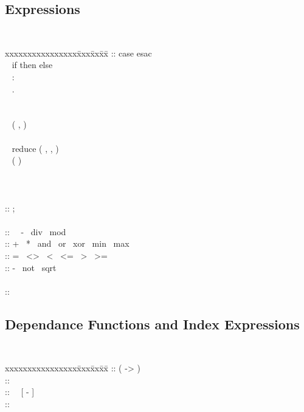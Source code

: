 \subsection{Expressions}
{\tt
\begin{tabbing}
xxxxxxxxxxxxxxxx\= xxx\= xx\=  xx\= \kill
\Expression\>::\>\> case \ExpressionList esac \\
\>\> \Alt\ \> if \Expression then \Expression else \Expression\\
\>\> \Alt\ \> \Domain :\Expression\\
\>\> \Alt\ \> \Expression .\AffineFunction\\
\>\> \Alt\ \> \Expression [ \IndexExpList ] \\
\>\> \Alt\ \> \Expression \BinaryOp \Expression\\
\>\> \Alt\ \> \BinaryOp ( \Expression, \Expression ) \\
\>\> \Alt\ \> \UnaryOp \Expression\\
\>\> \Alt\ \> reduce ( \CommutativeOp, \AffineFunction, \Expression ) \\
\>\> \Alt\ \> ( \Expression ) \\
\>\> \Alt\ \> \Identifier\\
\>\> \Alt\ \> \Constant\\
\\
\ExpressionList \>::\>\> \Opt{ \ExpressionList  } \Expression ;\\
\\
\BinaryOp \>::\>\> \CommutativeOp \Alt\ \RelativeOp \Alt\ - \Alt\ div \Alt\ mod\\
\CommutativeOp \>::\>\> + \Alt\ * \Alt\ and \Alt\ or \Alt\ xor \Alt\ min \Alt\ max\\
\RelativeOp \>::\>\> = \Alt\ <> \Alt\ < \Alt\ <= \Alt\ > \Alt\ >=\\
\UnaryOp \>::\>\> - \Alt\ not \Alt\ sqrt\\
\\
\Constant \>::\>\> \IntegerConstant \Alt\ \RealConstant \Alt\ \BooleanConstant\\
\end{tabbing}
}


\subsection{Dependance Functions and Index Expressions}
{\tt
\begin{tabbing}
xxxxxxxxxxxxxxxx\= xxx\= xx\=  xx\= \kill
\AffineFunction \>::\>\> ( \IndexList -> \IndexExpList )\\
\IndexExpList \>::\>\> \Opt{ \IndexExpList, } \IndexExpression\
          \Alt\ \IndexExpression\\
\IndexExpression \>::\>\> \IndexExpression \Group{+ \Alt\  - } \IndexTerm\
          \Alt\ [ - ] \IndexTerm\\
\IndexTerm \>::\>\> \IntegerConstant \Identifier \Alt\ \IntegerConstant \Alt\ \Identifier
\end{tabbing}
}


